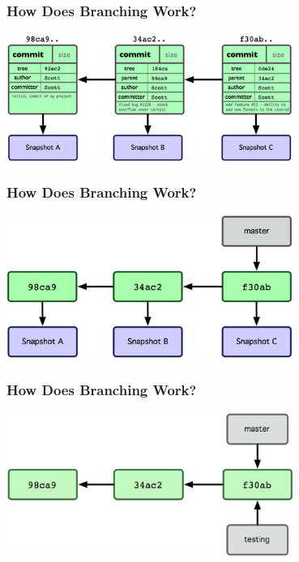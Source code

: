 \begin{frame}
\frametitle{\large How Does Branching Work?}
\begin{center}
\includegraphics[width=0.7\textwidth]{img/branching_images/fig2.png}
\end{center}
\end{frame}

\begin{frame}
\frametitle{\large How Does Branching Work?}
\begin{center}
\includegraphics[width=0.7\textwidth]{img/branching_images/fig3.png}
\end{center}
\end{frame}

\begin{frame}
\frametitle{\large How Does Branching Work?}
\begin{center}
\includegraphics[width=0.7\textwidth]{img/branching_images/fig4.png}
\end{center}
\end{frame}

